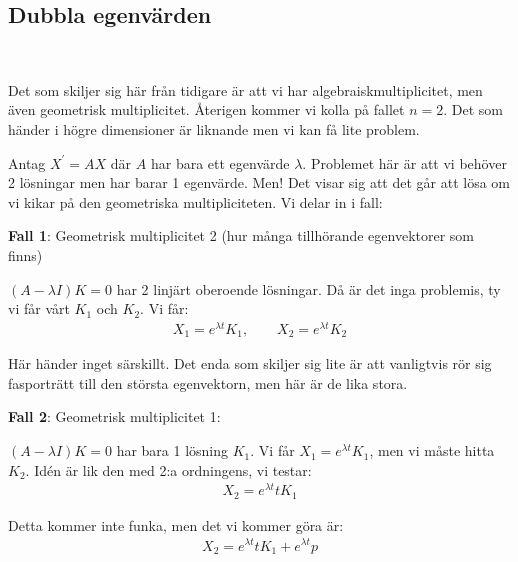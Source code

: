 \subsection{Dubbla egenvärden}\hfill\\
\par\bigskip
\noindent Det som skiljer sig här från tidigare är att vi har algebraiskmultiplicitet, men även geometrisk multiplicitet. Återigen kommer vi kolla på fallet $n=2$. Det som händer i högre dimensioner är liknande men vi kan få lite problem.
\par\bigskip
\noindent Antag $X^{\prime} = AX$ där $A$ har bara ett egenvärde $\lambda$. Problemet här är att vi behöver 2 lösningar men har barar 1 egenvärde. Men! Det visar sig att det går att lösa om vi kikar på den geometriska multipliciteten. Vi delar in i fall:
\par\bigskip
\noindent\textbf{Fall 1}: Geometrisk multiplicitet 2 (hur många tillhörande egenvektorer som finns)\par
\noindent $(A-\lambda I)K=0$ har 2 linjärt oberoende lösningar. Då är det inga problemis, ty vi får vårt $K_1$ och $K_2$. Vi får:
\begin{equation*}
  \begin{gathered}
    X_1 = e^{\lambda t}K_1,\qquad X_2 = e^{\lambda t}K_2
  \end{gathered}
\end{equation*}
\par\bigskip
\noindent Här händer inget särskillt. Det enda som skiljer sig lite är att vanligtvis rör sig fasporträtt till den största egenvektorn, men här är de lika stora.
\par\bigskip
\noindent\textbf{Fall 2}: Geometrisk multiplicitet 1:\par
\noindent $(A-\lambda I)K=0$ har bara 1 lösning $K_1$. Vi får $X_1 = e^{\lambda t}K_1$, men vi måste hitta $K_2$. Idén är lik den med 2:a ordningens, vi testar:
\begin{equation*}
  \begin{gathered}
    X_2 = e^{\lambda t}tK_1
  \end{gathered}
\end{equation*}\par
\noindent Detta kommer inte funka, men det vi kommer göra är:
\begin{equation*}
  \begin{gathered}
    X_2 = e^{\lambda t}tK_1+e^{\lambda t}p
  \end{gathered}
\end{equation*}\par
